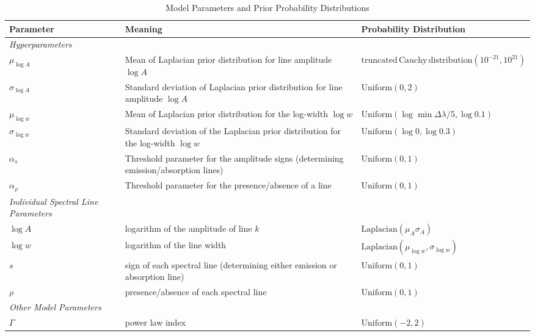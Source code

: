 \documentclass[12pt]{emulateapj}
\newcommand{\counts}{y}
\begin{document}
\begin{table*}[hbtp]
\renewcommand{\arraystretch}{1.3}
\footnotesize
\caption{Model Parameters and Prior Probability Distributions}
\begin{threeparttable} 
\begin{tabularx}{\textwidth}{p{4.0cm}p{7.0cm}X}
\toprule
\bf{Parameter} & \bf{Meaning} & \bf{Probability Distribution} \\ \midrule
\it{Hyperparameters} && \\ \midrule
$\mu_{\log{A}}$ & Mean of Laplacian prior distribution for line amplitude $\log{A}$ &   $\mathrm{truncated\, Cauchy\, distribution}(10^{-21}, 10^{21})$  \\
$\sigma_{\log{A}}$ & Standard deviation of Laplacian prior distribution for line amplitude $\log{A}$ & $\mathrm{Uniform}(0,2)$ \\
$\mu_{\log{w}}$ & Mean of Laplacian prior distribution for the log-width $\log{w}$ & $\mathrm{Uniform}(\log{\min{\Delta\lambda}/5}, \log{0.1})$  \\
$\sigma_{\log{w}}$ & Standard deviation of the Laplacian prior distribution for the log-width $\log{w}$ & $\mathrm{Uniform}(\log{0}, \log{0.3})$\\ 
$\alpha_s$ & Threshold parameter for the amplitude signs (determining emission/absorption lines) &  $\mathrm{Uniform}(0,1)$\\
$\alpha_{\rho}$ & Threshold parameter for the presence/absence of a line &  $\mathrm{Uniform}(0,1)$\\
\midrule
\it{Individual Spectral Line Parameters} && \\ \midrule
$\log{A}$ & logarithm of the amplitude of line $k$ & $\mathrm{Laplacian}(\mu_A \sigma_A)$ \\
$\log{w}$ & logarithm of the line width & $\mathrm{Laplacian}(\mu_{\log{w}}, \sigma_{\log{w}})$ \\
$s$ & sign of each spectral line (determining either emission or absorption line) &  $\mathrm{Uniform}(0,1)$\\
$\rho$ & presence/absence of each spectral line  &  $\mathrm{Uniform}(0,1)$\\
\midrule
\it{Other Model Parameters} && \\ \midrule
$\Gamma$ & power law index & $\mathrm{Uniform}(-2, 2)$ \\

\end{tabularx}
\end{threeparttable}
\end{table*}
\end{document}
